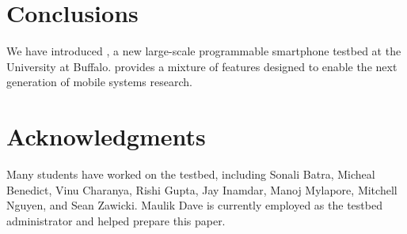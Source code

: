 \section{Conclusions}
\label{sec-conclusions}

We have introduced \PhoneLab{}, a new large-scale programmable smartphone
testbed at the University at Buffalo. \PhoneLab{} provides a mixture of
features designed to enable the next generation of mobile systems research.

\section*{Acknowledgments}

Many students have worked on the \PhoneLab{} testbed, including Sonali Batra,
Micheal Benedict, Vinu Charanya, Rishi Gupta, Jay Inamdar, Manoj Mylapore,
Mitchell Nguyen, and Sean Zawicki. Maulik Dave is currently employed as the
testbed administrator and helped prepare this paper.

